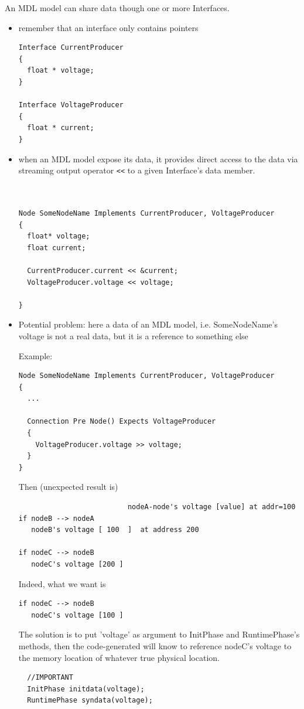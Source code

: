 An MDL model can share data though one or more Interfaces.
\begin{itemize}
  \item remember that an interface only contains pointers
\begin{verbatim}
Interface CurrentProducer
{
  float * voltage;
}

Interface VoltageProducer
{
  float * current;
}
\end{verbatim}

  \item when an MDL model expose its data, it provides direct access to the data
  via streaming output operator \verb!<<! to a given Interface's data member.

\begin{verbatim}


Node SomeNodeName Implements CurrentProducer, VoltageProducer
{
  float* voltage;
  float current;
  
  CurrentProducer.current << &current;
  VoltageProducer.voltage << voltage;
  
}
\end{verbatim}


  \item Potential problem: here a data of an MDL model, i.e. SomeNodeName's
  voltage is not a real data, but it is a reference to something else
  
Example:
\begin{verbatim}
Node SomeNodeName Implements CurrentProducer, VoltageProducer
{
  ...
  
  Connection Pre Node() Expects VoltageProducer
  {
    VoltageProducer.voltage >> voltage;
  } 
}
\end{verbatim}

Then (unexpected result is)
\begin{verbatim}
                          nodeA-node's voltage [value] at addr=100
if nodeB --> nodeA                          
   nodeB's voltage [ 100  ]  at address 200

if nodeC --> nodeB   
   nodeC's voltage [200 ]    
\end{verbatim}

Indeed, what we want is
\begin{verbatim}
if nodeC --> nodeB   
   nodeC's voltage [100 ]    
\end{verbatim}

The solution is to put 'voltage' as argument to InitPhase and RuntimePhase's
methods, then the code-generated will know to reference nodeC's voltage to the
memory location of whatever true physical location.

\begin{verbatim}
  //IMPORTANT
  InitPhase initdata(voltage);
  RuntimePhase syndata(voltage);
\end{verbatim}

\end{itemize}

